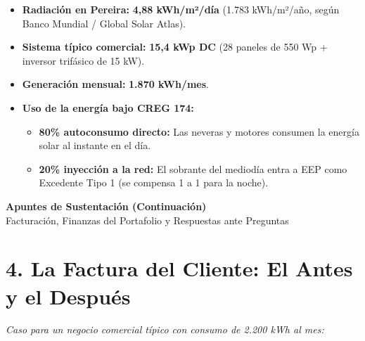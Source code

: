 \documentclass[11pt,letterpaper]{article}
\begin{document}
\begin{itemize}[leftmargin=1.5em, itemsep=4pt]
    \item \textbf{Radiación en Pereira:} \textbf{4,88 kWh/m²/día} (1.783 kWh/m²/año, según Banco Mundial / Global Solar Atlas).
    \item \textbf{Sistema típico comercial:} \textbf{15,4 kWp DC} (28 paneles de 550 Wp + inversor trifásico de 15 kW).
    \item \textbf{Generación mensual:} \textbf{1.870 kWh/mes}.
    \item \textbf{Uso de la energía bajo CREG 174:}
    \begin{itemize}[leftmargin=1.3em, itemsep=2pt]
        \item \textbf{80\% autoconsumo directo:} Las neveras y motores consumen la energía solar al instante en el día.
        \item \textbf{20\% inyección a la red:} El sobrante del mediodía entra a EEP como Excedente Tipo 1 (se compensa 1 a 1 para la noche).
    \end{itemize}
\end{itemize}

\clearpage

{\LARGE \textbf{\color{navy}Apuntes de Sustentación (Continuación)}}\\[2pt]
{\small\color{subgray} Facturación, Finanzas del Portafolio y Respuestas ante Preguntas}

\vspace{0.3cm}

\section*{4. La Factura del Cliente: El Antes y el Después}
\textit{\small Caso para un negocio comercial típico con consumo de 2.200 kWh al mes:}
\end{document}
